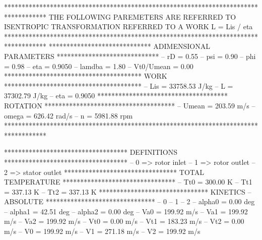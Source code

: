 ************************************************************************************
		THE FOLLOWING PAREMETERS ARE REFERRED TO ISENTROPIC
		  TRANSFORMATION REFERRED TO A WORK L = Lis / eta
************************************************************************************
***************************** ADIMENSIONAL PARAMETERS  *****************************
-- rD     =     0.55        -- psi    =     0.90        -- phi       =  0.98
-- eta    =     0.9050      -- lamdba =     1.80        -- Vt0/Umean =  0.00
*************************************** WORK ***************************************
-- Lis    = 33758.53 J/kg   -- L      = 37302.79 J/kg   -- eta    =     0.9050
************************************* ROTATION *************************************
-- Umean  =   203.59 m/s    -- omega  =   626.42 rad/s  -- n      =  5981.88 rpm
************************************************************************************

*********************************** DEFINITIONS  ***********************************
-- 0 => rotor inlet         -- 1 => rotor outlet        -- 2 => stator outlet
******************************** TOTAL TEMPERATURE  ********************************
-- Tt0    =   300.00 K      -- Tt1    =   337.13 K      -- Tt2    =   337.13 K
******************************* KINETICS -- ABSOLUTE *******************************
-- 0                        -- 1                        -- 2
-- alpha0 =     0.00 deg    -- alpha1 =    42.51 deg    -- alpha2 =     0.00 deg
-- Va0    =   199.92 m/s    -- Va1    =   199.92 m/s    -- Va2    =   199.92 m/s
-- Vt0    =     0.00 m/s    -- Vt1    =   183.23 m/s    -- Vt2    =     0.00 m/s
-- V0     =   199.92 m/s    -- V1     =   271.18 m/s    -- V2     =   199.92 m/s

